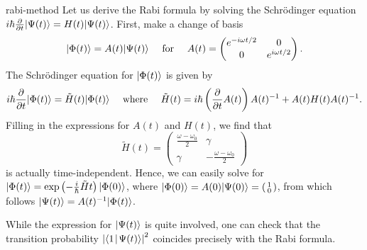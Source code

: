 \begin{example}{rabi-method}
    Let us derive the Rabi formula by solving the Schrödinger equation $i \hbar \frac{\partial}{\partial t} |\Psi(t)\rangle = H(t) |\Psi(t)\rangle$. First, make a change of basis
    \[ |\Phi(t)\rangle = A(t) |\Psi(t)\rangle \quad \textup{ for } \quad A(t) = \begin{pmatrix} e^{-i \omega t / 2} & 0 \\ 0 & e^{i \omega t / 2} \end{pmatrix} . \]
    The Schrödinger equation for $|\Phi(t)\rangle$ is given by
    \[ i \hbar \frac{\partial}{\partial t} |\Phi(t)\rangle = \tilde{H}(t) |\Phi(t)\rangle \quad \textup{ where } \quad \tilde{H}(t) = i \hbar \left( \frac{\partial}{\partial t} A(t) \right) A(t)^{-1} + A(t) H(t) A(t)^{-1} . \]
    Filling in the expressions for $A(t)$ and $H(t)$, we find that
    \[ \tilde{H}(t) = \begin{pmatrix} \frac{\omega - \omega_0}{2} & \gamma \\ \gamma & - \frac{\omega - \omega_0}{2} \end{pmatrix} \]
    is actually time-independent. Hence, we can easily solve for $|\Phi(t)\rangle = \exp \left( - \tfrac{i}{\hbar} \tilde{H} t \right) |\Phi(0)\rangle$, where $|\Phi(0)\rangle = A(0) |\Psi(0)\rangle = \left( \begin{smallmatrix} 1 \\ 0 \end{smallmatrix} \right)$, from which follows $|\Psi(t)\rangle = A(t)^{-1} |\Phi(t)\rangle$.
    
    While the expression for $|\Psi(t)\rangle$ is quite involved, one can check that the transition probability $\left|\langle1\!\mid\!\Psi(t)\rangle\right|^2$ coincides precisely with the Rabi formula.
\end{example}

